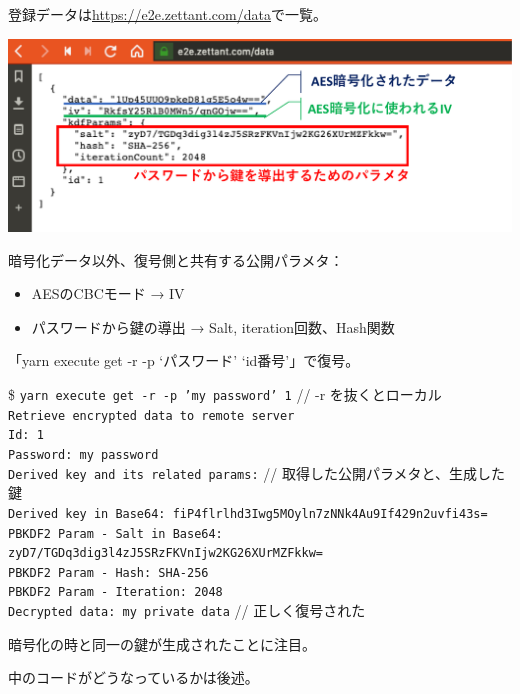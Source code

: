\documentclass[12pt,dvipdfmx]{beamer}
\begin{document}
\begin{frame}
登録データは\url{https://e2e.zettant.com/data}で一覧。

\begin{center}
\includegraphics[width=\linewidth]{FigsSample02/data_pbes.pdf}
\end{center} 

暗号化データ以外、復号側と共有する公開パラメタ：
\begin{itemize}
 \item AESのCBCモード → IV
 \item パスワードから鍵の導出 → Salt, iteration回数、Hash関数
\end{itemize}
\end{frame}

\begin{frame}
 「yarn execute get -r -p `パスワード' `id番号'」で復号。
\begin{block}{}
\scriptsize
\$ \texttt{yarn execute get -r -p 'my password' 1} // -r を抜くとローカル\\
\texttt{Retrieve encrypted data to remote server}\\
\texttt{Id: 1}\\
\texttt{Password: my password}\\
{\color{blue}
\texttt{Derived key and its related params:} // 取得した公開パラメタと、生成した鍵\\
\texttt{\quad Derived key in Base64: fiP4flrlhd3Iwg5MOyln7zNNk4Au9If429n2uvfi43s=}\\
\texttt{\quad PBKDF2 Param - Salt in Base64: zyD7/TGDq3dig3l4zJ5SRzFKVnIjw2KG26XUrMZFkkw=}\\
\texttt{\quad PBKDF2 Param - Hash: SHA-256}\\
\texttt{\quad PBKDF2 Param - Iteration: 2048}\\
}
\texttt{Decrypted data: my private data} // 正しく復号された
\end{block}

暗号化の時と同一の鍵が生成されたことに注目。

\vspace{2ex}

中のコードがどうなっているかは後述。
\end{frame}
\end{document}
